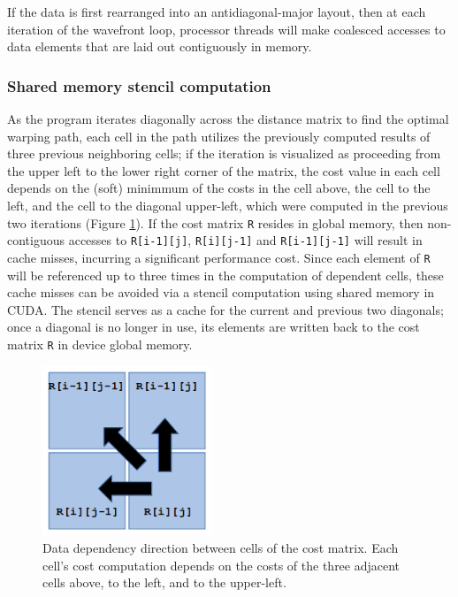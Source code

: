 \documentclass[12pt, letterpaper]{article}
\begin{document}
If the data is first rearranged into an antidiagonal-major layout, then at each
iteration of the wavefront loop, processor threads will make coalesced accesses
to data elements that are laid out contiguously in memory.

\subsubsection{Shared memory stencil computation}

As the program iterates diagonally across the distance matrix to find the
optimal warping path, each cell in the path utilizes the previously computed
results of three previous neighboring cells; if the iteration is visualized as
proceeding from the upper left to the lower right corner of the matrix, the cost
value in each cell depends on the (soft) minimmum of the costs in the cell
above, the cell to the left, and the cell to the diagonal upper-left, which were
computed in the previous two iterations (Figure \ref{cost_deps}). If the cost
matrix \verb|R| resides in global memory, then non-contiguous accesses to
\verb|R[i-1][j]|, \verb|R[i][j-1]| and \verb|R[i-1][j-1]| will result in cache
misses, incurring a significant performance cost. Since each element of \verb|R|
will be referenced up to three times in the computation of dependent cells,
these cache misses can be avoided via a stencil computation using shared memory
in CUDA. The stencil serves as a cache for the current and previous two
diagonals; once a diagonal is no longer in use, its elements are written back to
the cost matrix \verb|R| in device global memory.

\begin{figure}[htbp]
\includegraphics[height=2in]{img/cost_dependencies.png}
\centering
\caption{Data dependency direction between cells of the cost matrix.
Each cell's cost computation depends on the costs of the three adjacent cells
above, to the left, and to the upper-left.}
\label{cost_deps}
\end{figure}
\end{document}
